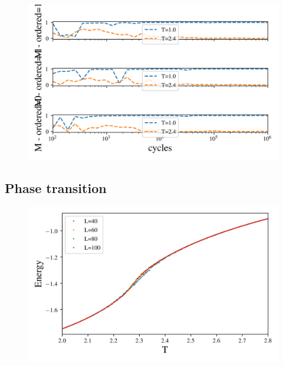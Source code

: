 \begin{figure}[H]
  \centering
  \includegraphics[width=\textwidth]{../figures/equilibrium_M.png}
  \caption{}
  \label{fig:equi_M}
\end{figure}


\subsection{Phase transition}

\begin{figure}[H]
  \centering
  \includegraphics[width=\textwidth]{../figures/phase_E.png}
  \caption{}
  \label{fig:phase_E}
\end{figure}

